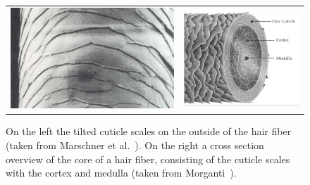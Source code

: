 \documentclass[11pt,a4paper]{report}
\begin{document}
\begin{figure}[h]
\begin{center}
\begin{tabular}{cc}
\includegraphics[scale=0.3]{images/hair_structure.jpeg} & \includegraphics[scale=0.27]{hair-core.png} \\
\end{tabular}
\caption{On the left the tilted cuticle scales on the outside of the hair fiber (taken from Marschner et al.~\cite{marschner}). On the right a cross section overview of the core of a hair fiber, consisting of the cuticle scales with the cortex and medulla (taken from Morganti~\cite{morganti2015}).}
\label{fig_hair_structure}
\end{center}
\end{figure}
\end{document}

